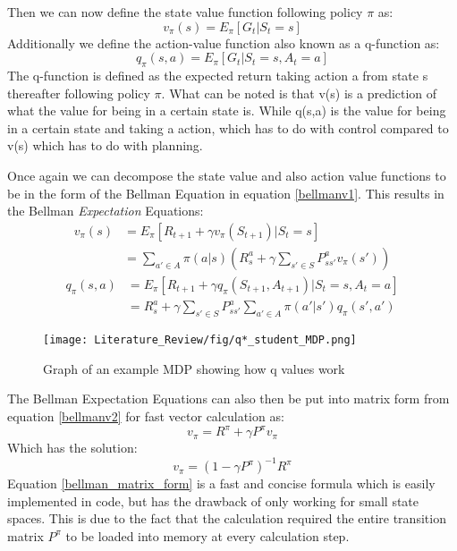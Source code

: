 Then we can now define the state value function following policy $\pi$ as:
\[v_{\pi}(s) = E_{\pi}[G_t | S_t = s]\]
Additionally we define the action-value function also known as a q-function as:
\[q_{\pi}(s,a) = E_{\pi}[G_t | S_t = s,A_t = a]\]
The q-function is defined as the expected return taking action a from state s thereafter following policy $\pi$. What can be noted is that v(s) is a prediction of what the value for being in a certain state is. While q(s,a) is the value for being in a certain state and taking a action, which has to do with control compared to v(s) which has to do with planning. 

Once again we can decompose the state value and also action value functions to be in the form of the Bellman Equation in equation \ref{bellmanv1}. This results in the Bellman \textit{Expectation} Equations:
\begin{align}
	v_{\pi}(s)	&= E_{\pi}[R_{t+1} + \gamma v_{\pi}(S_{t+1})|S_t = s]\\
	&= \sum_{a'\in A}\pi(a|s)(R^{a}_s+\gamma\sum_{s'\in S}P^{a}_{ss'}v_\pi(s'))
	\label{bellmanv2}
\end{align}
\begin{align}
	q_{\pi}(s,a)	&= E_{\pi}[R_{t+1} + \gamma q_{\pi}(S_{t+1},A_{t+1})|S_t = s,A_t = a]\\
	&= R^{a}_s +\gamma \sum_{s'\in S}P^{a}_{ss'}\sum_{a'\in A}\pi(a'|s')q_\pi(s',a')
	\label{bellmanq}
\end{align}

\begin{figure}[!htb]
	\centering
	\texttt{[image: Literature\_Review/fig/q*\_student\_MDP.png]}
	\caption{Graph of an example MDP showing how q values work\cite{David_Silver}}
	\label{fig:q*}
	\centering
\end{figure}
The Bellman Expectation Equations can also then be put into matrix form from equation \ref{bellmanv2} for fast vector calculation as:
\begin{equation}
	v_\pi = R^{\pi} + \gamma P^{\pi}v_\pi
\end{equation}
Which has the solution:
\begin{equation}
	v_\pi = (1 - \gamma P^{\pi})^{-1}R^{\pi}
	\label{bellman_matrix_form}
\end{equation}
Equation \ref{bellman_matrix_form} is a fast and concise formula which is easily implemented in code, but has the drawback of only working for small state spaces. This is due to the fact that the calculation required the entire transition matrix $P^\pi$ to be loaded into memory at every calculation step.

